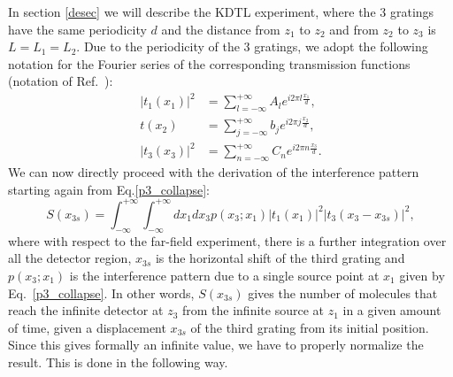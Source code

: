\documentclass[12pt,groupedaddress,pra,aps]{revtex4-1}
\begin{document}
In section \ref{desec} we will describe the KDTL experiment, where the 3 gratings have the same periodicity $d$ and the distance from $z_1$ to $z_2$ and from $z_2$ to $z_3$ is $L=L_1=L_2$. Due to the periodicity of the 3 gratings, we adopt the following notation for the Fourier series of the corresponding transmission functions (notation of Ref.~\cite{1464-4266-5-2-362}):
\begin{align}
|t_1(x_1)|^2 &= \sum_{l=-\infty}^{+\infty} A_l e^{ i2\pi l\frac{x_1}{d}}, \label{t1}\\
t(x_2) &= \sum_{j=-\infty}^{+\infty} b_j e^{ i2\pi j\frac{x_2}{d}}, \label{t2}\\
|t_3(x_3)|^2 &= \sum_{n=-\infty}^{+\infty} C_n e^{i2\pi n\frac{x_3}{d} } . \label{t3}
\end{align}
We can now directly proceed with the derivation of the interference pattern starting again from Eq.\eqref{p3_collapse}:
\begin{equation}\label{sx3si}
S(x_{3s})=\int_{-\infty}^{+\infty} \int_{-\infty}^{+\infty} dx_1 dx_3 p(x_3; x_1)
|t_1(x_1)|^2 |t_3(x_3-x_{3s})|^2 ,
\end{equation}
where with respect to the far-field experiment, there is a further integration over all the detector region,  $x_{3s}$ is the horizontal shift of the third grating and $p(x_3; x_1)$ is the interference pattern due to a single source point at $x_1$ given by Eq.~\eqref{p3_collapse}. In other words, $S(x_{3s})$ gives the number of molecules that reach the infinite detector at $z_3$ from the infinite source at $z_1$ in a given amount of time, given a displacement $x_{3s}$ of the third grating from its initial position. Since this gives formally an infinite value, we have to properly normalize the result. This is done in the following way.
\end{document}
